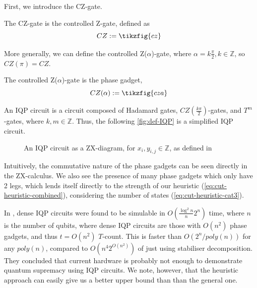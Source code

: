 First, we introduce the CZ-gate.

\begin{definition}[CZ-gate]
    The CZ-gate is the controlled Z-gate, defined as
\begin{equation}
    CZ := \tikzfig{cz}
\end{equation}
\end{definition}

More generally, we can define the controlled Z($\alpha$)-gate, 
where $\alpha=k\frac{\pi}{2}, k\in \mathbb{Z}$, so $CZ(\pi) = CZ$.

\begin{definition}
    The controlled Z($\alpha$)-gate is the phase gadget,
\begin{equation}
    CZ(\alpha) := \tikzfig{cza}
\end{equation}
\end{definition}


\begin{definition}
    An IQP circuit is a circuit composed of Hadamard gates, $CZ(\frac{k\pi}{2})$-gates,
    and $T^m$-gates, where $k,m\in \mathbb{Z}$.
    Thus, the following \autoref{fig:def-IQP} is a simplified IQP circuit.
\begin{figure}[h!]
    \caption{An IQP circuit as a ZX-diagram, for $x_i,y_{i,j}\in\mathbb{Z}$, 
    as defined in \cite{codsi2023}}
    \label{fig:def-IQP}
\end{figure}
\end{definition}

Intuitively, the commutative nature of the phase gadgets can be seen directly in the ZX-calculus.
We also see the presence of many phase gadgets which only have 2 legs,
which lends itself directly to the strength of our heuristic (\ref{eq:cut-heuristic-combined}),
considering the number of  states (\ref{eq:cut-heuristic-cat3}).

In \cite{codsi2023}, dense IQP circuits were found to be simulable in $O(\frac{\log^2 n}{n}2^{n})$ time,
where $n$ is the number of qubits,
where dense IQP circuits are those with $O(n^2)$ phase gadgets, and thus $t= O(n^2)$ $T$-count.
This is faster than $O(2^n/poly(n))$ for any $poly(n)$,
compared to $O(n^4 2^{O(n^2)})$ of just using stabiliser decomposition.
They concluded that current hardware is probably not enough to demonstrate quantum supremacy
using IQP circuits.
We note, however, that the heuristic approach can easily give us a better upper bound than than the general one.

